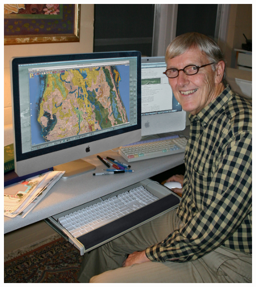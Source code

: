 \documentclass[../resume.tex]{subfiles}
\begin{document}
\includegraphics[scale=0.3]{../fun/Michael_Clendenin_Miller564x633.jpg} 

\end{document}
